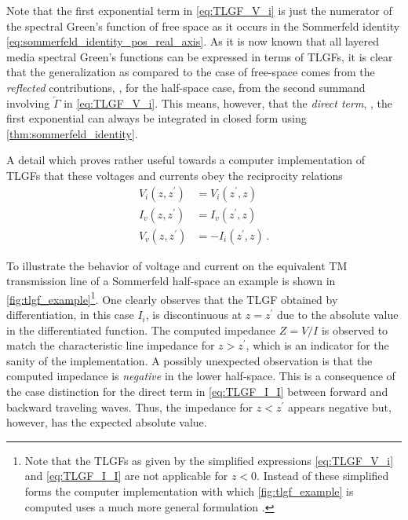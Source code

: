 Note that the first exponential term in \eqref{eq:TLGF_V_i} is just the
numerator of the spectral Green's function of free space as it occurs in the
Sommerfeld identity \eqref{eq:sommerfeld_identity_pos_real_axis}.
As it is now known that all layered media spectral Green's functions can be
expressed in terms of \acp{TLGF}, it is clear that the generalization
as compared to the case of free-space comes from the \emph{reflected}
contributions, \ie, for the half-space case, from the second summand involving
$\overleftarrow{\Gamma}$ in \eqref{eq:TLGF_V_i}.
This means, however, that the \emph{direct term}, \ie, the first exponential
can always be integrated in closed form using \cref{thm:sommerfeld_identity}.

A detail which proves rather useful towards a computer implementation of
\acp{TLGF} that these voltages and currents obey the reciprocity relations
\cite{Michalski2005}
\begin{subequations}\label{eq:tlgf_reciprocity}
	\begin{align}
		V_i
		\left(z , z^\prime\right)
		&=
		V_i
		\left(z^\prime, z\right)
		\\
		I_v
		\left(z, z^\prime\right)
		&=
		I_v
		\left(z^\prime, z\right)
		\\
		V_v
		\left(z , z^\prime\right)
		&=
		-I_i
		\left(z^\prime, z\right)
		\, .
	\end{align}
\end{subequations}

To illustrate the behavior of voltage and current on the equivalent
\ac{TM} transmission line of a Sommerfeld half-space an example is shown in
\cref{fig:tlgf_example}\footnote{Note that the \acp{TLGF} as given by the
simplified expressions \eqref{eq:TLGF_V_i} and \eqref{eq:TLGF_I_I} are not
applicable for $z < 0$. Instead of these simplified forms the computer
implementation with which \cref{fig:tlgf_example} is computed uses a much more
general formulation \cite{Michalski2005}.}.
One clearly observes that the \ac{TLGF} obtained by differentiation, in this
case $I_i$, is discontinuous at $z = z^\prime$ due to the absolute value
in the differentiated function.
The computed impedance $Z = V / I$ is observed to match the characteristic
line impedance for $z > z^\prime$, which is an indicator for the sanity of
the implementation.
A possibly unexpected observation is that the computed impedance is
\emph{negative} in the lower half-space.
This is a consequence of the case distinction for the direct term in
\eqref{eq:TLGF_I_I} between forward and backward traveling waves.
Thus, the impedance for $z < z^\prime$ appears negative but, however,
has the expected absolute value.

